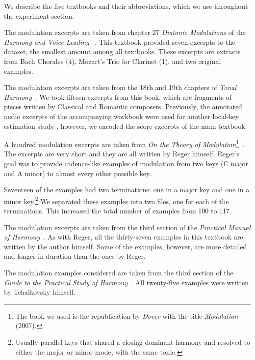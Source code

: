 We describe the five textbooks and their abbreviations,
which we use throughout the experiment section.


	The modulation excerpts are taken from chapter 27
	\emph{Diatonic Modulations} of the \emph{Harmony and
	Voice Leading} ~\parencite{aldwell2018harmony}. This textbook
	provided seven excerpts to the dataset, the smallest
	amount among all textbooks. These excerpts are extracts
	from Bach Chorales (4), Mozart's Trio for Clarinet (1),
	and two original examples.

	The modulation excerpts are taken from the 18th and 19th
	chapters of \emph{Tonal Harmony}~\parencite{kostka2008tonal}.
	We took fifteen excerpts from this book, which are
	fragments of pieces written by Classical and Romantic
	composers. Previously, the annotated audio excerpts of
	the accompanying workbook were used for another
	local-key estimation study \parencite{izmirli2007localized},
	however, we encoded the score excerpts of the main
	textbook.

	A hundred modulation excerpts are taken from \emph{On
	the Theory of Modulation}\footnote{The book we used is
	the republication by \emph{Dover} with the title
	\emph{Modulation} (2007).}~\parencite{regermodulation}. The
	excerpts are very short and they are all written by
	Reger himself. Reger's goal was to provide cadence-like
	examples of modulation from two keys (C major and A
	minor) to almost every other possible key.

	Seventeen of the examples had two terminations: one in a
	major key and one in a minor key.\footnote{Usually
	parallel keys that shared a closing dominant harmony and
	resolved to either the major or minor mode, with the
	same tonic.} We separated these examples into two files,
	one for each of the terminations. This increased the
	total number of examples from 100 to 117.

	The modulation excerpts are taken from the third section
	of the \emph{Practical Manual of
	Harmony}~\parencite{rimskitonality}. As with Reger, all the
	thirty-seven examples in this textbook are written by
	the author himself. Some of the examples, however, are
	more detailed and longer in duration than the ones by
	Reger.

	The modulation examples considered are taken from the
	third section of the \emph{Guide to the Practical Study
	of Harmony}~\parencite{tchaikovsky1872guide}. All twenty-five
	examples were written by Tchaikovsky himself.

